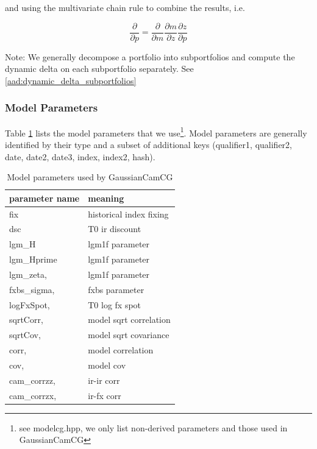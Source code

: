 and using the multivariate chain rule to combine the results, i.e.

$$
\frac{\partial}{\partial p} = \frac{\partial}{\partial m} \frac{\partial m}{\partial z} \frac{\partial z}{\partial p}
$$

Note: We generally decompose a portfolio into subportfolios and compute the dynamic delta on each subportfolio
separately. See \ref{aad:dynamic_delta_subportfolios}

\subsubsection{Model Parameters}

Table \ref{tab:aad_modelparams} lists the model parameters that we use\footnote{see modelcg.hpp, we only list
non-derived parameters and those used in GaussianCamCG}. Model parameters are generally identified by their type and a
subset of additional keys (qualifier1, qualifier2, date, date2, date3, index, index2, hash).

\begin{table}[htb]
  \begin{tabular}{l|l}
            parameter name   & meaning \\
    \hline
            fix               & historical index fixing \\
            dsc               & T0 ir discount \\
            lgm\_H            & lgm1f parameter \\
            lgm\_Hprime       & lgm1f parameter \\
            lgm\_zeta,        & lgm1f parameter \\
            fxbs\_sigma,      & fxbs parameter \\
            logFxSpot,        & T0 log fx spot \\
            sqrtCorr,         & model sqrt correlation \\
            sqrtCov,          & model sqrt covariance \\
            corr,             & model correlation \\
            cov,              & model cov \\
            cam\_corrzz,      & ir-ir corr \\
            cam\_corrzx,      & ir-fx corr \\
    \hline
\end{tabular}
\caption{Model parameters used by GaussianCamCG}
\label{tab:aad_modelparams}
\end{table}

